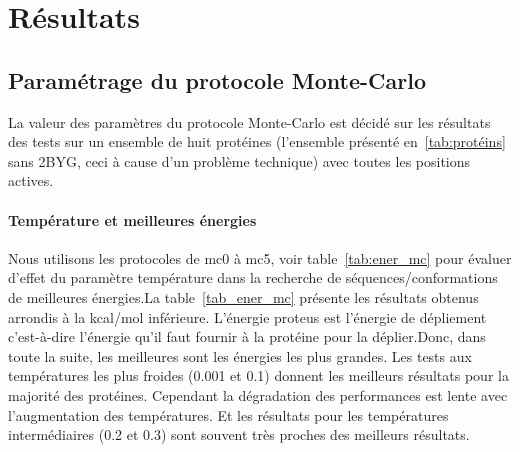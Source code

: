 \clearpage

    \section{Résultats} 

    \subsection{Paramétrage du protocole Monte-Carlo}

La valeur des paramètres du protocole Monte-Carlo est décidé sur les résultats des tests sur un ensemble de huit protéines (l'ensemble présenté en~\ref{tab:protéins} sans 2BYG, ceci à cause d'un problème technique) avec toutes les positions actives.

   \paragraph{Température et meilleures énergies} 
Nous utilisons les protocoles de mc0 à mc5, voir table~\ref{tab:ener_mc} pour évaluer d'effet du paramètre température dans la recherche de séquences/conformations de meilleures énergies.La table~\ref{tab_ener_mc} présente les résultats obtenus arrondis à la kcal/mol inférieure. L'énergie proteus est l'énergie de dépliement c'est-à-dire l'énergie qu'il faut fournir à la protéine pour la déplier.Donc, dans toute la suite, les meilleures sont les énergies les plus grandes. Les tests aux températures les plus froides (0.001 et 0.1) donnent les meilleurs résultats  pour la majorité des protéines. Cependant la dégradation des performances est lente avec l'augmentation des températures. Et les résultats pour les températures intermédiaires (0.2 et 0.3) sont souvent très proches des meilleurs résultats.    

